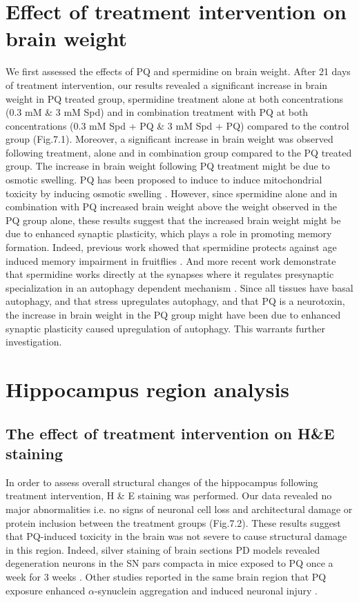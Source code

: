 \section{Effect of treatment intervention on brain weight}
We first assessed the effects of PQ and spermidine on brain weight. After 21 days of treatment intervention, our results revealed a significant increase in brain weight in PQ treated group, spermidine treatment alone at both concentrations (0.3 mM \& 3 mM Spd) and in combination treatment with PQ at both concentrations (0.3 mM Spd + PQ \& 3 mM Spd + PQ) compared to the control group (Fig.7.1). Moreover, a significant increase in brain weight was observed following treatment, alone and in combination group compared to the PQ treated group. The increase in brain weight following PQ treatment might be due to osmotic swelling. PQ has been proposed to induce to induce mitochondrial toxicity by inducing osmotic swelling \citep{Cappelletti1996,Mohammadi-Bardbori2008}. However, since spermidine alone and in combination with PQ increased brain weight above the weight observed in the PQ group alone, these results suggest that the increased brain weight might be due to enhanced synaptic plasticity, which plays a role in promoting memory formation. Indeed, previous work showed that spermidine protects against age induced memory impairment in fruitflies \citep{Gupta2016,Gupta2013,Sigrist2014}. And more recent work demonstrate that spermidine works directly at the synapses where it regulates presynaptic specialization in an autophagy dependent mechanism \citep{Bhukel2017}. Since all tissues have basal autophagy, and that stress upregulates autophagy, and that PQ is a neurotoxin, the increase in brain weight in the PQ group might have been due to enhanced synaptic plasticity caused upregulation of autophagy. This warrants further investigation.

\section{Hippocampus region analysis} 
\subsection{The effect of treatment intervention on H\&E staining}
In order to assess overall structural changes of the hippocampus following treatment intervention, H \& E staining was performed. Our data revealed no major abnormalities i.e. no signs of neuronal cell loss and architectural damage or protein inclusion between the treatment groups (Fig.7.2). These results suggest that PQ-induced toxicity in the brain was not severe to cause structural damage in this region. Indeed, silver staining of brain sections PD models revealed degeneration neurons in the SN pars compacta in mice exposed to PQ once a week for 3 weeks \citep{McCormack2002}. Other studies reported in the same brain region that PQ exposure enhanced $\alpha$-synuclein aggregation \citep{Manning-Bog2002} and induced neuronal injury \citep{Manning-Bog2003}.
